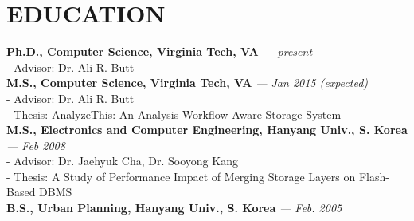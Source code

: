 \section{EDUCATION}
\vspace{0.07in} 
{\bf Ph.D., Computer Science, Virginia Tech, VA}
{\footnotesize{\it --- present}} \\
  - {\small Advisor: Dr. Ali R. Butt}
\vspace{0.03in}\\
{\bf M.S., Computer Science, Virginia Tech, VA}
{\footnotesize{\it --- Jan 2015 (expected)}} \\
  - {\small Advisor: Dr. Ali R. Butt} \\
  - {\small Thesis: AnalyzeThis: An Analysis Workflow-Aware Storage System}
\vspace{0.03in}\\
{\bf M.S., Electronics and Computer Engineering, Hanyang Univ., S. Korea}
{\footnotesize{\it --- Feb 2008}}\\
  - {\small Advisor: Dr. Jaehyuk Cha, Dr. Sooyong Kang}\\
  - {\small Thesis: A Study of Performance Impact of Merging Storage Layers on
  Flash-Based DBMS}
\vspace{0.03in}\\
{\bf B.S., Urban Planning, Hanyang Univ., S. Korea}
{\footnotesize{\it --- Feb. 2005}}

